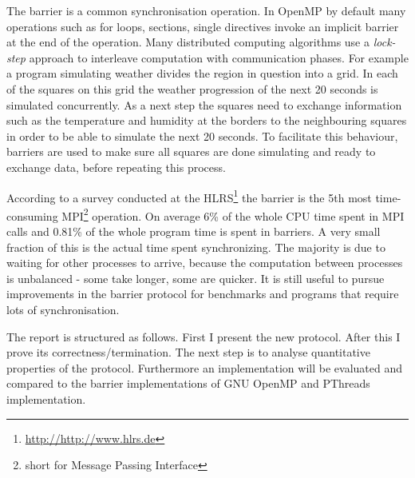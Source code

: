 \documentclass[a4paper, 10pt]{article}
\begin{document}
The barrier is a common synchronisation operation. In OpenMP\cite{omp} by default many operations such as for loops, sections, single directives invoke an implicit barrier at the end of the operation. Many distributed computing algorithms use a \emph{lock-step} approach to interleave computation with communication phases. For example a program simulating weather divides the region in question into a grid. In each of the squares on this grid the weather progression of the next 20 seconds is simulated concurrently. As a next step the squares need to exchange information such as the temperature and humidity at the borders to the neighbouring squares in order to be able to simulate the next 20 seconds. To facilitate this behaviour, barriers are used to make sure all squares are done simulating and ready to exchange data, before repeating this process.

According to a survey conducted at the HLRS\footnote{\url{http://http://www.hlrs.de}}\cite{rab00} the barrier is the 5th most time-consuming MPI\footnote{short for Message Passing Interface}\cite{mpi} operation. On average 6\% of the whole CPU time spent in MPI calls and 0.81\% of the whole program time is spent in barriers. A very small fraction of this is the actual time spent synchronizing. The majority is due to waiting for other processes to arrive, because the computation between processes is unbalanced - some take longer, some are quicker. It is still useful to pursue improvements in the barrier protocol for benchmarks and programs that require lots of synchronisation.

The report is structured as follows. First I present the new protocol. After this I prove its correctness/termination. The next step is to analyse quantitative properties of the protocol. Furthermore an implementation will be evaluated and compared to the barrier implementations of GNU OpenMP\cite{gomp} and PThreads\cite{glibc} implementation.

\end{document}
